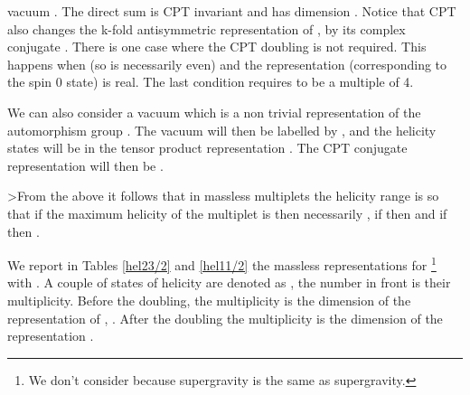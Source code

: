 \documentclass[a4paper,12pt]{article}
\begin{document}
  vacuum \coordHE{}. The direct sum is CPT invariant and has dimension \coordHE{}.
   Notice that CPT  also changes the k-fold antisymmetric representation of \coordHE{}, \myHighlight{$[k]$}\coordHE{} by its
    complex conjugate \myHighlight{$[\bar k]\approx [N-k]$}\coordHE{}. There is one case where the CPT doubling is not required.
     This happens when  \coordHE{} (so  \coordHE{} is  necessarily even) and the representation
      \myHighlight{$[N/2]$}\coordHE{} (corresponding to the spin 0 state) is real. The last condition requires \coordHE{} to be a multiple of 4.


We can also consider a vacuum which is a non trivial representation \coordHE{} of the automorphism group \coordHE{}.
 The vacuum will then be labelled by \coordHE{}, and the helicity states will be in the
  tensor product representation \coordHE{}. The CPT conjugate representation will then be
  \coordHE{}.

>From the above it follows that in massless multiplets the helicity range is \coordHE{} so
 that if the maximum helicity \coordHE{} of the multiplet is \coordHE{} then
  necessarily \coordHE{}, if \coordHE{} then  \coordHE{} and if \coordHE{} then
  \coordHE{}.

We report in Tables \ref{hel23/2} and \ref{hel11/2} the massless representations for \coordHE{}
 \footnote{We don't consider \coordHE{} because \coordHE{} supergravity is the same as \coordHE{} supergravity.}
  with  \coordHE{}.  A couple of  states of helicity \myHighlight{$\pm\lambda$}\coordHE{} are denoted as  \myHighlight{$(\lambda)$}\coordHE{},
   the number in front is their multiplicity. Before the doubling, the multiplicity is   the dimension  of
    the representation \myHighlight{$[k]$}\coordHE{} of \coordHE{}, \coordHE{}. After the doubling the multiplicity
    is the dimension of the representation \myHighlight{$[k]\oplus[4\lambda-k]$}\coordHE{}.
\end{document}
